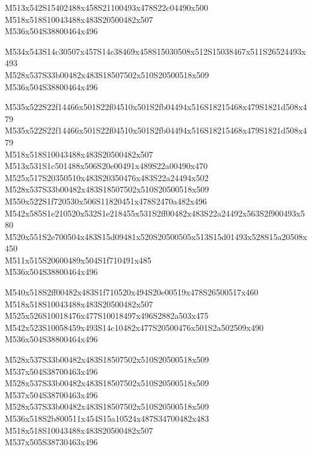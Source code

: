 \documentclass{article}
\begin{document}
\begin{multicols}{5}
\begin{center}
M513x542S15402488x458S21100493x478S22c04490x500 %
\\M518x518S10043488x483S20500482x507 %
\\M536x504S38800464x496 %

M534x543S14c30507x457S14c38469x458S15030508x512S15038467x511S26524493x493 %
\\M528x537S33b00482x483S18507502x510S20500518x509 %
\\M536x504S38800464x496 %

M535x522S22f14466x501S22f04510x501S2fb04494x516S18215468x479S1821d508x479 %
\\M535x522S22f14466x501S22f04510x501S2fb04494x516S18215468x479S1821d508x479 %
\\M518x518S10043488x483S20500482x507 %
\\M513x531S1c501488x506S20e00491x489S22a00490x470 %
\\M525x517S20350510x483S20350476x483S22a24494x502 %
\\M528x537S33b00482x483S18507502x510S20500518x509 %
\\M550x522S1f720530x506S11820451x478S2470a482x496 %
\\M542x585S1e210520x532S1e218455x531S2ff00482x483S22a24492x563S2f900493x580 %
\\M520x551S2e700504x483S15d09481x520S20500505x513S15d01493x528S15a20508x450 %
\\M511x515S20600489x504S1f710491x485 %
\\M536x504S38800464x496 %

M540x518S2ff00482x483S1f710520x494S20e00519x478S26500517x460 %
\\M518x518S10043488x483S20500482x507 %
\\M525x526S10018476x477S10018497x496S2882a503x475 %
\\M542x523S10058459x493S14c10482x477S20500476x501S2a502509x490 %
\\M536x504S38800464x496 %

M528x537S33b00482x483S18507502x510S20500518x509 %
\\M537x504S38700463x496 %
\\M528x537S33b00482x483S18507502x510S20500518x509 %
\\M537x504S38700463x496 %
\\M528x537S33b00482x483S18507502x510S20500518x509 %
\\M536x518S2b800511x454S15a10524x487S34700482x483 %
\\M518x518S10043488x483S20500482x507 %
\\M537x505S38730463x496 %


\end{center}
\end{multicols}
\end{document}
